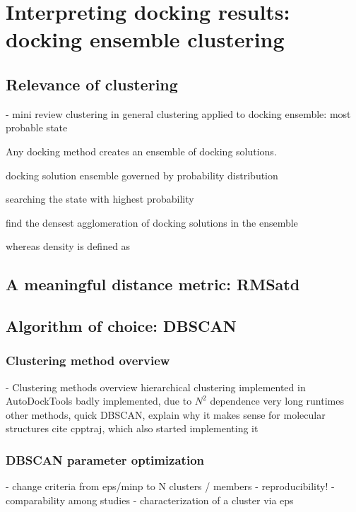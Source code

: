 \chapter{Interpreting docking results: docking ensemble clustering}
\section{Relevance of clustering}


    -  mini review
        clustering in general
        clustering applied to docking ensemble: most probable state


Any docking method creates an ensemble of docking solutions.

docking solution ensemble governed by probability distribution

searching the state with highest probability

find the densest agglomeration of docking solutions in the ensemble

whereas density is defined as


\section{A meaningful distance metric: RMSatd}

\section{Algorithm of choice: DBSCAN}

\subsection{Clustering method overview}

    - Clustering methods overview
        hierarchical clustering implemented in AutoDockTools
            badly implemented, due to $N^2$ dependence very long runtimes
        other methods, quick
        DBSCAN, explain why it makes sense for molecular structures
        cite cpptraj, which also started implementing it

\subsection{DBSCAN parameter optimization}

    - change criteria from eps/minp to N clusters / members
    - reproducibility!
    - comparability among studies
    - characterization of a cluster via eps


